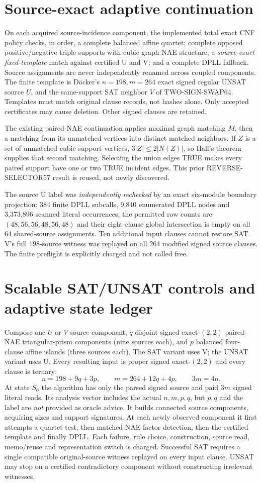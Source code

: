 \documentclass[11pt]{article}
\begin{document}
\section{Source-exact adaptive continuation}
On each acquired source-incidence component, the implemented total exact CNF policy checks, in order, a complete balanced affine quartet; complete opposed positive/negative triple supports with cubic graph NAE structure; a \emph{source-exact fixed-template} match against certified U and V; and a complete DPLL fallback. Source assignments are never independently renamed across coupled components. The finite template is D\"ocker's $n=198,m=264$ exact signed regular UNSAT source $U$, and the same-support SAT neighbor $V$ of TWO-SIGN-SWAP64. Templates must match original clause records, not hashes alone. Only accepted certificates may cause deletion. Other signed clauses are retained.

The existing paired-NAE continuation applies maximal graph matching $M$, then a matching from its unmatched vertices into distinct matched neighbors. If $Z$ is a set of unmatched cubic support vertices, $3|Z|\le2|N(Z)|$, so Hall's theorem supplies that second matching. Selecting the union edges TRUE makes every paired support have one or two TRUE incident edges. This prior REVERSE-SELECTOR57 result is reused, not newly discovered.

The source U label was \emph{independently rechecked} by an exact six-module boundary projection: 384 finite DPLL subcalls, 9,840 enumerated DPLL nodes and 3,373,896 scanned literal occurrences; the permitted row counts are $(48,56,56,48,56,48)$ and their eight-clause global intersection is empty on all 64 shared-source assignments. Ten additional input clauses cannot restore SAT. V's full 198-source witness was replayed on all 264 modified signed source clauses. The finite preflight is explicitly charged and not called free.

\section{Scalable SAT/UNSAT controls and adaptive state ledger}
Compose one $U$ or $V$ source component, $q$ disjoint signed exact-$(2,2)$ paired-NAE triangular-prism components (nine sources each), and $p$ balanced four-clause affine islands (three sources each). The SAT variant uses V; the UNSAT variant uses U. Every resulting input is proper signed exact-$(2,2)$ and every clause is ternary:
\[
n=198+9q+3p,\qquad m=264+12q+4p,\qquad3m=4n.
\]
At state $S_0$ the algorithm has only the parsed signed source and paid $3m$ signed literal reads. Its analysis vector includes the actual $n,m,p,q$, but $p,q$ and the label are \emph{not} provided as oracle advice. It builds connected source components, acquiring sizes and support signatures. At each newly observed component it first attempts a quartet test, then matched-NAE factor detection, then the certified template and finally DPLL. Each failure, rule choice, construction, source read, memo/reuse and representation switch is charged. Successful SAT requires a single compatible original-source witness replayed on every input clause. UNSAT may stop on a certified contradictory component without constructing irrelevant witnesses.
\end{document}
